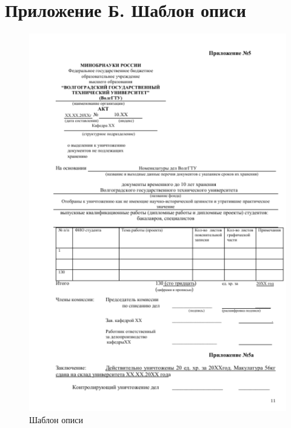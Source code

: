 \documentclass[14pt, a4paper]{extarticle}
\begin{document}
	\section*{Приложение Б. Шаблон описи}
	\begin{figure}[h!]
	\includegraphics[width=\linewidth]{diagram2.png}
	\caption{Шаблон описи}
	\label{fig:diagram2}
	\end{figure}
	
\end{document}
